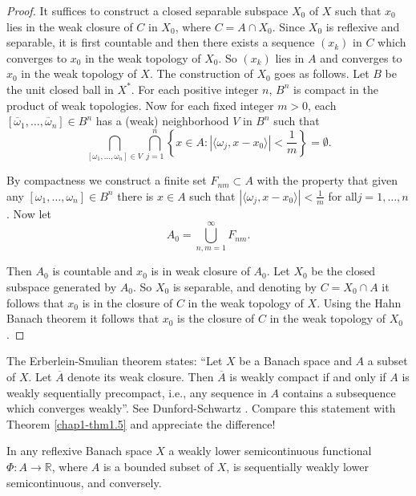 \begin{proof}
It suffices to construct a closed separable subspace $X_{0}$ of $X$
such that $x_{0}$ lies in the weak closure of $C$ in $X_{0}$, where
$C=A\cap X_{0}$. Since $X_{0}$ is reflexive and separable, it is first
countable and then there exists a sequence $(x_{k})$ in $C$ which
converges to $x_{0}$ in the weak topology of $X_{0}$. So $(x_{k})$
lies in $A$ and converges to $x_{0}$ in the weak topology of $X$. The
construction of $X_{0}$ goes as follows. Let $B$ be the unit closed
ball in $X^{*}$. For each positive integer $n$, $B^{n}$ is compact in
the product of weak topologies. Now for each fixed integer $m>0$, each
$[\overline{\omega}_{1},\ldots,\overline{\omega}_{n}]\in B^{n}$ has a
(weak) neighborhood $V$ in $B^{n}$ such that 
$$
\bigcap\limits_{[\omega_{1},\ldots,\omega_{n}]\in
  V}\bigcap\limits^{n}_{j=1}\left\{x\in A:|\langle
\omega_{j},x-x_{0}\rangle |<\frac{1}{m}\right\}=\emptyset. 
$$

By compactness we construct a finite set $F_{nm}\subset A$ with the
property that given any $[\omega_{1},\ldots,\omega_{n}]\in B^{n}$
there is $x\in A$ such that $|\langle \omega_{j},x-x_{0}\rangle
|<\frac{1}{m}$ for all\pageoriginale $j=1,\ldots,n$. Now let
$$
A_{0}=\bigcup\limits^{\infty}_{n,m=1}F_{nm}.
$$

Then $A_{0}$ is countable and $x_{0}$ is in weak closure of
$A_{0}$. Let $X_{0}$ be the closed subspace generated by $A_{0}$. So
$X_{0}$ is separable, and denoting by $C=X_{0}\cap A$ it follows that
$x_{0}$ is in the closure of $C$ in the weak topology of $X$. Using
the Hahn Banach theorem it follows that $x_{0}$ is the closure of $C$
in the weak topology of $X_{0}$. 
\end{proof}

\begin{remark*}
The Erberlein-Smulian theorem states: ``Let $X$ be a Banach space and
$A$ a subset of $X$. Let $\overline{A}$ denote its weak closure. Then
$\overline{A}$ is weakly compact if and only if $A$ is weakly
sequentially precompact, i.e., any sequence in $A$ contains a
subsequence which converges weakly''. See Dunford-Schwartz
\cite[p. 430]{key35}. Compare this statement with Theorem
\ref{chap1-thm1.5} and appreciate the difference!
\end{remark*}

\begin{coro*}
In any reflexive Banach space $X$ a weakly lower semicontinuous
functional $\Phi:A\to \mathbb{R}$, where $A$ is a bounded subset of
$X$, is sequentially weakly lower semicontinuous, and conversely.
\end{coro*}
